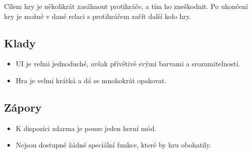 Cílem hry je několikrát zasáhnout protihráče, a tím ho zneškodnit.
Po ukončení hry je možné v dané relaci s protihráčem začít další kolo hry.

\subsection*{Klady}

\begin{itemize}
    \item UI je velmi jednoduché, avšak přívětivé svými barvami a srozumitelností.
    \item Hra je velmi krátká a dá se mnohokrát opakovat.
\end{itemize}

\subsection*{Zápory}

\begin{itemize}
    \item K dispozici zdarma je pouze jeden herní mód.
    \item Nejsou dostupné žádné speciální funkce, které by hru obohatily.
\end{itemize}
